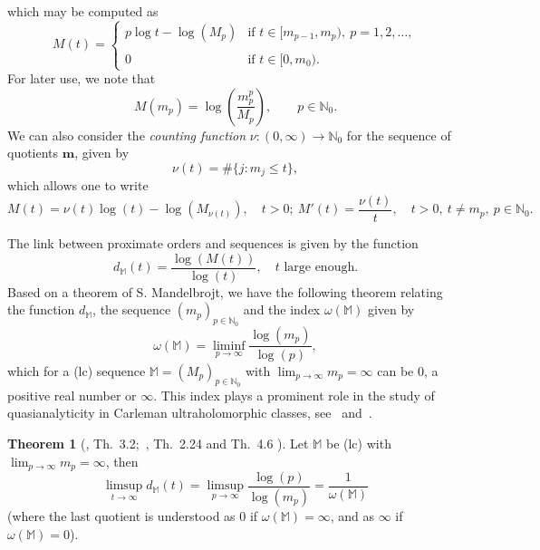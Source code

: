 \documentclass[11pt,a4paper]{article}
\theoremstyle{definition}
\newtheorem{theo}{Theorem}[section]
\def\oo{\infty}
\def\ri{\rightarrow}
\def\o{\omega}
\def\N{\mathbb{N}}
\def\M{\mathbb{M}}
\def\bm{\boldsymbol{m}}
\begin{document}
which may be computed as
 \begin{equation*}\label{equaexprMdet}
M(t)=\left \{ \begin{matrix}  p\log t -\log(M_{p}) & \mbox{if }t\in [m_{p-1},m_{p}),\ p=1,2,\ldots,\\
\\
0 & \mbox{if } t\in [0,m_{0}). \end{matrix}\right.
\end{equation*}
For later use, we note that
\begin{equation}
 M(m_p)=\log \left( \frac{m^p_p}{M_p}\right), \qquad p\in \N_0. \label{equation.M.in.mp}
\end{equation}
We can also consider the \textit{counting function} $\nu:(0,\infty)\to\N_0$ for the sequence of quotients $\bm$, given by
\begin{equation*}
\nu(t)=\#\{j:m_j\le t\},
\end{equation*}
which allows one to write
\begin{equation}\label{equaRelationM_nu}
M(t)=\nu(t)\log(t)-\log(M_{\nu(t)}),\quad t>0;\ M'(t)=\frac{\nu(t)}{t},\quad t>0,\ t\neq m_p,\ p\in\N_0.
\end{equation}

The link between proximate orders and sequences is given by the function
\begin{equation}\label{equaDefidM}
d_{\M}(t)=\frac{\log(M(t))}{\log (t)},\quad t\textrm{ large enough}.
\end{equation}
Based on a theorem of S. Mandelbrojt, we have the following theorem relating the function $d_{\M}$, the sequence $(m_p)_{p\in\N_0}$ and the index $\o(\M)$ given by
\begin{equation*}
\omega(\M)=\liminf_{p\to\infty}
\frac{\log(m_{p})}{\log(p)},
\end{equation*}
which for a (lc) sequence $\M=(M_p)_{p\in\N_0}$ with $\lim_{p\to\infty} m_p=\infty$ can be 0, a positive real number or $\infty$. This index plays a prominent role in the study of quasianalyticity in Carleman ultraholomorphic classes, see~\cite{JimenezSanz} and~\cite{SanzAsymptoticAnalysis}.


\begin{theo}[\cite{JimenezSanz}, Th.\ 3.2;\ \cite{SanzAsymptoticAnalysis}, Th.\ 2.24 and Th.\ 4.6 ]\label{theo.limsup.dM.omega}
Let $\M$  be (lc) with $\lim_{p\ri\oo}m_p=\oo$, then
$$\limsup_{t\to\infty} d_{\M}(t)
=\limsup_{p\to\infty}\frac{\log(p)}{\log(m_{p})}=\frac{1}{\o(\M)}$$
(where the last quotient is understood as 0 if $\o(\M)=\infty$, and as $\infty$ if $\o(\M)=0$).
\end{theo}
\end{document}
